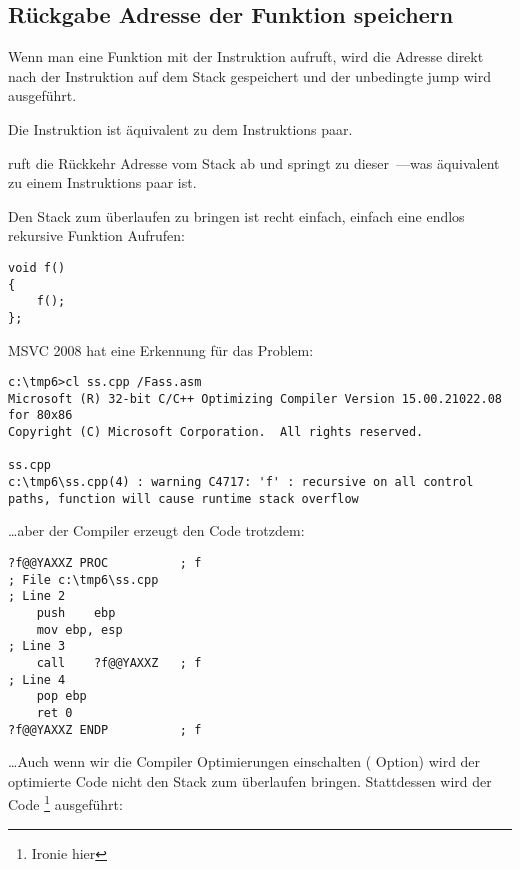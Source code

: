 \subsection{Rückgabe Adresse der Funktion speichern}


Wenn man eine Funktion mit der \CALL Instruktion aufruft, wird die Adresse direkt nach der
\CALL Instruktion auf dem Stack gespeichert und der unbedingte jump wird ausgeführt.

Die \CALL Instruktion ist äquivalent zu dem  Instruktions paar.

\RET ruft die Rückkehr Adresse vom Stack ab und springt zu dieser~---was äquivalent zu einem  Instruktions
paar ist.

\myindex{\Recursion}

Den Stack zum überlaufen zu bringen ist recht einfach, einfach eine 
endlos rekursive Funktion Aufrufen:


\begin{lstlisting}[style=customc]
void f()
{
	f();
};
\end{lstlisting}


MSVC 2008 hat eine Erkennung für das Problem:


\begin{lstlisting}
c:\tmp6>cl ss.cpp /Fass.asm
Microsoft (R) 32-bit C/C++ Optimizing Compiler Version 15.00.21022.08 for 80x86
Copyright (C) Microsoft Corporation.  All rights reserved.

ss.cpp
c:\tmp6\ss.cpp(4) : warning C4717: 'f' : recursive on all control paths, function will cause runtime stack overflow
\end{lstlisting}

\dots aber der Compiler erzeugt den Code trotzdem:

\begin{lstlisting}[style=customasmx86]
?f@@YAXXZ PROC			; f
; File c:\tmp6\ss.cpp
; Line 2
	push	ebp
	mov	ebp, esp
; Line 3
	call	?f@@YAXXZ	; f
; Line 4
	pop	ebp
	ret	0
?f@@YAXXZ ENDP			; f
\end{lstlisting}

\dots Auch wenn wir die Compiler Optimierungen einschalten ( Option) wird der optimierte Code nicht
den Stack zum überlaufen bringen. Stattdessen wird der Code \footnote{Ironie hier} ausgeführt: 

